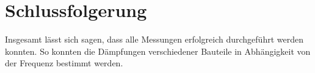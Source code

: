 \documentclass[
	a4paper,
	12pt,
	pagesize,
	ngerman
]{scrartcl}
\begin{document}
	\section{Schlussfolgerung}
	Insgesamt lässt sich sagen, dass alle Messungen erfolgreich durchgeführt werden konnten.
	So konnten die Dämpfungen verschiedener Bauteile in Abhängigkeit von der Frequenz bestimmt werden.

	\printbibliography
\end{document}
